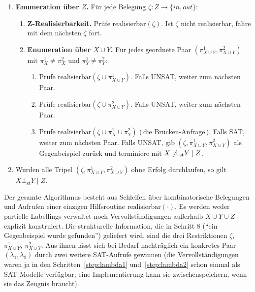 \begin{enumerate}
    \item \label{step:enum-z}
        \textbf{Enumeration über \(Z\).} Für jede Belegung
        \(\zeta : Z \to \{\mathit{in},\mathit{out}\}\):

    \begin{enumerate}
        \item \label{step:check-z-real}
            \textbf{Z-Realisierbarkeit.} Prüfe
            \(\mathrm{realisierbar}(\zeta)\). Ist \(\zeta\) nicht
            realisierbar, fahre mit dem nächsten \(\zeta\) fort.

        \item \label{step:enum-xy}
            \textbf{Enumeration über \(X\cup Y\).} Für jedes geordnete
            Paar
            \((\pi^1_{X\cup Y}, \pi^2_{X\cup Y})\) mit
            \(\pi^1_X \neq \pi^2_X\) und \(\pi^1_Y \neq \pi^2_Y\):

        \begin{enumerate}
            \item \label{step:lambda1}
                Prüfe \(\mathrm{realisierbar}(\zeta \cup
                \pi^1_{X\cup Y})\). Falls UNSAT, weiter zum nächsten
                Paar.

            \item \label{step:lambda2}
                Prüfe \(\mathrm{realisierbar}(\zeta \cup
                \pi^2_{X\cup Y})\). Falls UNSAT, weiter zum nächsten
                Paar.

            \item \label{step:bridge}
                Prüfe \(\mathrm{realisierbar}(\zeta \cup \pi^1_X \cup
                \pi^2_Y)\) (\,die Brücken-Anfrage\,). Falls SAT, weiter
                zum nächsten Paar. Falls UNSAT, gib
                \((\zeta, \pi^1_{X\cup Y}, \pi^2_{X\cup Y})\) als
                Gegenbeispiel zurück und terminiere mit
                \(X \not\bot_{\mathrm{st}} Y \mid Z\).
        \end{enumerate}
    \end{enumerate}

    \item \label{step:exhaust}
        Wurden alle Tripel \((\zeta, \pi^1_{X\cup Y}, \pi^2_{X\cup Y})\)
        ohne Erfolg durchlaufen, so gilt \(X \bot_{\mathrm{st}} Y \mid Z\).
\end{enumerate}

Der gesamte Algorithmus besteht aus Schleifen über kombinatorische
Belegungen und Aufrufen einer einzigen Hilfsroutine
\(\mathrm{realisierbar}(\cdot)\). Es werden weder partielle Labellings
verwaltet noch Vervollständigungen außerhalb \(X\cup Y\cup Z\)
explizit konstruiert. Die strukturelle Information, die in Schritt 8
(``ein Gegenbeispiel wurde gefunden'') geliefert wird, sind die drei
Restriktionen \(\zeta\), \(\pi^1_{X\cup Y}\), \(\pi^2_{X\cup Y}\). Aus
ihnen lässt sich bei Bedarf nachträglich ein konkretes Paar
\((\lambda_1, \lambda_2)\) durch zwei weitere SAT-Aufrufe gewinnen
(die Vervollständigungen waren ja in den Schritten~\ref{step:lambda1}
und~\ref{step:lambda2} schon einmal als SAT-Modelle verfügbar; eine
Implementierung kann sie zwischenspeichern, wenn sie das Zeugnis
braucht).

